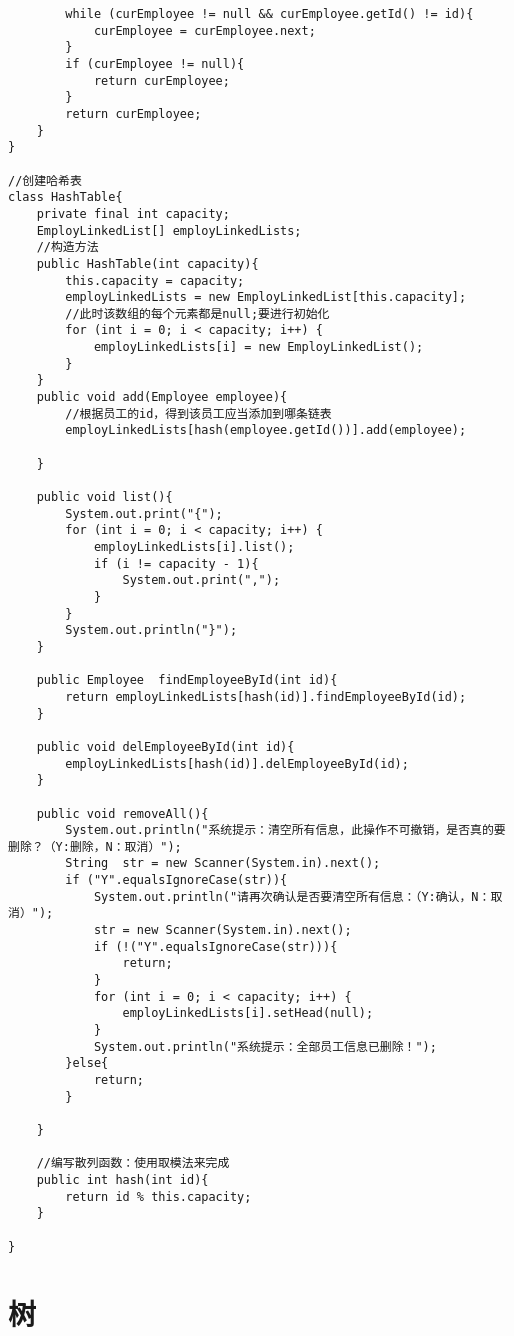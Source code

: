 \documentclass[a4paper]{report}
\begin{document}
\begin{lstlisting}
        while (curEmployee != null && curEmployee.getId() != id){
            curEmployee = curEmployee.next;
        }
        if (curEmployee != null){
            return curEmployee;
        }
        return curEmployee;
    }
}

//创建哈希表
class HashTable{
    private final int capacity;
    EmployLinkedList[] employLinkedLists;
    //构造方法
    public HashTable(int capacity){
        this.capacity = capacity;
        employLinkedLists = new EmployLinkedList[this.capacity];
        //此时该数组的每个元素都是null;要进行初始化
        for (int i = 0; i < capacity; i++) {
            employLinkedLists[i] = new EmployLinkedList();
        }
    }
    public void add(Employee employee){
        //根据员工的id，得到该员工应当添加到哪条链表
        employLinkedLists[hash(employee.getId())].add(employee);

    }

    public void list(){
        System.out.print("{");
        for (int i = 0; i < capacity; i++) {
            employLinkedLists[i].list();
            if (i != capacity - 1){
                System.out.print(",");
            }
        }
        System.out.println("}");
    }

    public Employee  findEmployeeById(int id){
        return employLinkedLists[hash(id)].findEmployeeById(id);
    }

    public void delEmployeeById(int id){
        employLinkedLists[hash(id)].delEmployeeById(id);
    }

    public void removeAll(){
        System.out.println("系统提示：清空所有信息，此操作不可撤销，是否真的要删除？（Y:删除，N：取消）");
        String  str = new Scanner(System.in).next();
        if ("Y".equalsIgnoreCase(str)){
            System.out.println("请再次确认是否要清空所有信息：（Y:确认，N：取消）");
            str = new Scanner(System.in).next();
            if (!("Y".equalsIgnoreCase(str))){
                return;
            }
            for (int i = 0; i < capacity; i++) {
                employLinkedLists[i].setHead(null);
            }
            System.out.println("系统提示：全部员工信息已删除！");
        }else{
            return;
        }

    }

    //编写散列函数：使用取模法来完成
    public int hash(int id){
        return id % this.capacity;
    }

}
\end{lstlisting}

\chapter{树}
\end{document}
